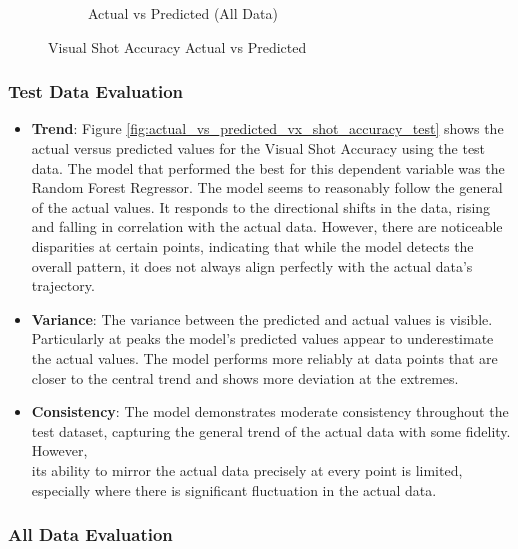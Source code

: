 \begin{figure}[htbp]
\begin{subfigure}[b]{0.49\textwidth}
        \caption{Actual vs Predicted (All Data)}
        \label{fig:actual_vs_predicted_vx_shot_accuracy_all_data}
    \end{subfigure}
    \caption{Visual Shot Accuracy Actual vs Predicted}
    \label{fig:visual_shot_accuracy_comparison}
\end{figure}

\subsubsection*{Test Data Evaluation}

\begin{itemize}
    \item \textbf{Trend}: Figure \ref{fig:actual_vs_predicted_vx_shot_accuracy_test} shows the actual versus predicted values for the Visual Shot Accuracy using the test data. The model that performed 
    the best for this dependent variable was the Random Forest Regressor. The model seems to reasonably follow the general of the actual values. It responds to the directional shifts in the data,
    rising and falling in correlation with the actual data. However, there are noticeable disparities at certain points, indicating that while the model detects the overall pattern, it does not always align
    perfectly with the actual data's trajectory.       
    \item \textbf{Variance}: The variance between the predicted and actual values is visible. Particularly at peaks the model's predicted values appear to underestimate the actual values. The model performs 
    more reliably at data points that are closer to the central trend and shows more deviation at the extremes.    
    \item \textbf{Consistency}: The model demonstrates moderate consistency throughout the test dataset, capturing the general trend of the actual data with some fidelity. However, \\ 
    its ability to mirror the actual data precisely at every point is limited, especially where there is significant fluctuation in the actual data.
    
\end{itemize}

\subsubsection*{All Data Evaluation}


